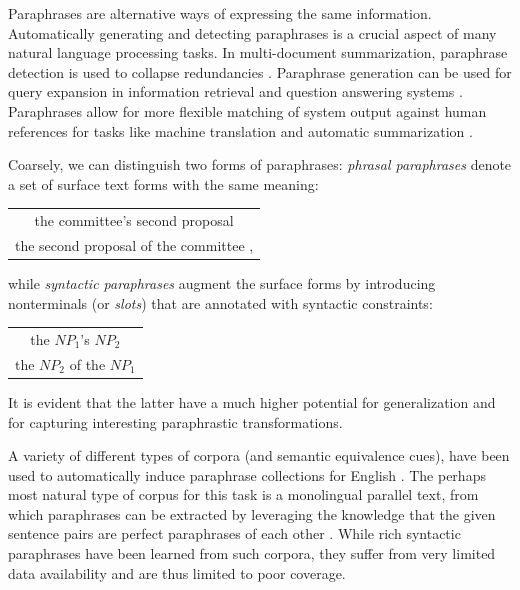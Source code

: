 \documentclass[11pt]{article}
\begin{document}
Paraphrases are alternative ways of expressing the same information. 
Automatically generating and detecting paraphrases is a crucial aspect of many 
natural language processing tasks.
In multi-document summarization, paraphrase detection is used
to collapse redundancies \cite{Barzilay1999}. Paraphrase generation can be used 
for query expansion in information retrieval and question
answering systems \cite{mckeown:1979:ACL,Anick1999,Ravichandran2002,Riezler2007}. 
Paraphrases allow for more flexible matching of system output against human references for tasks like machine translation and automatic summarization \cite{Zhou2006b,Kauchak2006,Owczarzak2006,Madnani2007,Snover2010}. 

Coarsely, we can distinguish two forms of paraphrases: \emph{phrasal
  paraphrases} denote a set of surface text forms with the same
meaning:
\begin{center}
\begin{tabular}{c}
the committee's second proposal \\
the second proposal of the committee ,
\end{tabular}
\end{center}
while \emph{syntactic paraphrases} augment the surface forms by
introducing nonterminals (or \emph{slots}) that are annotated with
syntactic constraints:
\begin{center}
\begin{tabular}{c}
the $\mathit{NP}_1$'s $\mathit{NP}_2$ \\
the $\mathit{NP}_2$ of the $\mathit{NP}_1$
\end{tabular}
\end{center}
It is evident that the latter have a much higher potential for
generalization and for capturing interesting paraphrastic transformations.

A variety of different types of corpora (and semantic equivalence
cues), have been used to automatically induce paraphrase collections
for English \cite{Madnani2010}. The perhaps most natural type of corpus for this task is
a monolingual parallel text, from which paraphrases can be extracted
by leveraging the knowledge that the given sentence pairs are perfect
paraphrases of each other \cite{Barzilay2001,Pang2003}. While rich
syntactic paraphrases have been learned from such corpora, they suffer
from very limited data availability and are thus limited to poor
coverage.
\end{document}
